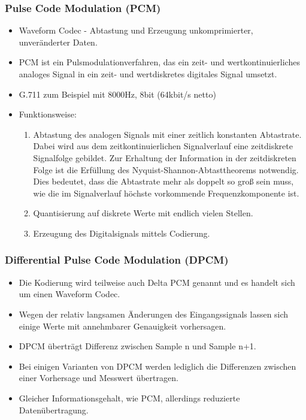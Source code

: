 \documentclass{article} %
\begin{document}
\subsubsection{Pulse Code Modulation (PCM)}
\begin{itemize}
	\item Waveform Codec - Abtastung und Erzeugung unkomprimierter, unveränderter Daten.
	\item PCM ist ein Pulsmodulationverfahren, das ein zeit- und wertkontinuierliches analoges Signal in ein zeit- und wertdiskretes digitales Signal umsetzt.
	\item G.711 zum Beispiel mit 8000Hz, 8bit (64kbit/s netto)
	\item Funktionsweise:
	\begin{enumerate}
		\item Abtastung des analogen Signals mit einer zeitlich konstanten Abtastrate. Dabei wird aus dem zeitkontinuierlichen Signalverlauf eine zeitdiskrete Signalfolge gebildet. Zur Erhaltung der Information in der zeitdiskreten Folge ist die Erfüllung des Nyquist-Shannon-Abtasttheorems notwendig. Dies bedeutet, dass die Abtastrate mehr als doppelt so groß sein muss, wie die im Signalverlauf höchste vorkommende Frequenzkomponente ist.
		\item Quantisierung auf diskrete Werte mit endlich vielen Stellen.
		\item Erzeugung des Digitalsignals mittels Codierung.
	\end{enumerate}
\end{itemize}
\subsubsection{Differential Pulse Code Modulation (DPCM)}
\begin{itemize}
	\item Die Kodierung wird teilweise auch Delta PCM genannt und es handelt sich um einen Waveform Codec.
	\item Wegen der relativ langsamen Änderungen des Eingangssignals lassen sich einige Werte mit annehmbarer Genauigkeit	vorhersagen.
	\item DPCM überträgt Differenz zwischen Sample n und Sample n+1.
	\item Bei einigen Varianten von DPCM werden lediglich die Differenzen zwischen einer Vorhersage und Messwert übertragen.
	\item Gleicher Informationsgehalt, wie PCM, allerdings reduzierte Datenübertragung.
\end{itemize}
\end{document}
